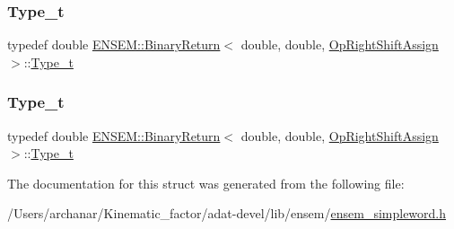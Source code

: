 \mbox{\label{structENSEM_1_1BinaryReturn_3_01double_00_01double_00_01OpRightShiftAssign_01_4_a4a608032925ea3919409492676f39f69}} 
\subsubsection{\texorpdfstring{Type\_t}{Type\_t}\hspace{0.1cm}{\footnotesize\ttfamily [2/3]}}
{\footnotesize\ttfamily typedef double \mbox{\hyperlink{structENSEM_1_1BinaryReturn}{E\+N\+S\+E\+M\+::\+Binary\+Return}}$<$ double, double, \mbox{\hyperlink{structENSEM_1_1OpRightShiftAssign}{Op\+Right\+Shift\+Assign}} $>$\+::\mbox{\hyperlink{structENSEM_1_1BinaryReturn_3_01double_00_01double_00_01OpRightShiftAssign_01_4_a4a608032925ea3919409492676f39f69}{Type\+\_\+t}}}

\mbox{\label{structENSEM_1_1BinaryReturn_3_01double_00_01double_00_01OpRightShiftAssign_01_4_a4a608032925ea3919409492676f39f69}} 
\subsubsection{\texorpdfstring{Type\_t}{Type\_t}\hspace{0.1cm}{\footnotesize\ttfamily [3/3]}}
{\footnotesize\ttfamily typedef double \mbox{\hyperlink{structENSEM_1_1BinaryReturn}{E\+N\+S\+E\+M\+::\+Binary\+Return}}$<$ double, double, \mbox{\hyperlink{structENSEM_1_1OpRightShiftAssign}{Op\+Right\+Shift\+Assign}} $>$\+::\mbox{\hyperlink{structENSEM_1_1BinaryReturn_3_01double_00_01double_00_01OpRightShiftAssign_01_4_a4a608032925ea3919409492676f39f69}{Type\+\_\+t}}}



The documentation for this struct was generated from the following file\+:\begin{DoxyCompactItemize}
\item 
/\+Users/archanar/\+Kinematic\+\_\+factor/adat-\/devel/lib/ensem/\mbox{\hyperlink{adat-devel_2lib_2ensem_2ensem__simpleword_8h}{ensem\+\_\+simpleword.\+h}}\end{DoxyCompactItemize}
